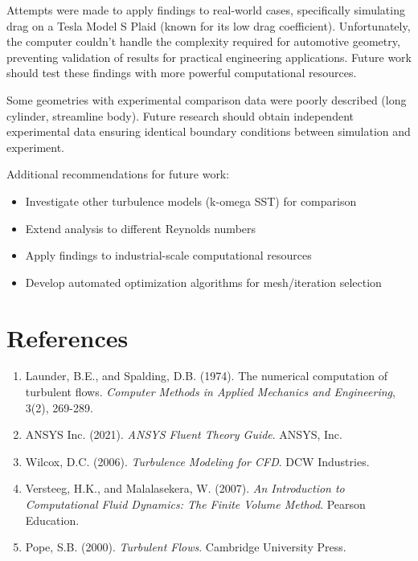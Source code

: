 \documentclass[12pt,a4paper]{article}
\begin{document}
Attempts were made to apply findings to real-world cases, specifically simulating drag on a Tesla Model S Plaid (known for its low drag coefficient). Unfortunately, the computer couldn't handle the complexity required for automotive geometry, preventing validation of results for practical engineering applications. Future work should test these findings with more powerful computational resources.

Some geometries with experimental comparison data were poorly described (long cylinder, streamline body). Future research should obtain independent experimental data ensuring identical boundary conditions between simulation and experiment.

Additional recommendations for future work:
\begin{itemize}
    \item Investigate other turbulence models (k-omega SST) for comparison
    \item Extend analysis to different Reynolds numbers
    \item Apply findings to industrial-scale computational resources
    \item Develop automated optimization algorithms for mesh/iteration selection
\end{itemize}

\section{References}

\begin{enumerate}
    \item Launder, B.E., and Spalding, D.B. (1974). The numerical computation of turbulent flows. \textit{Computer Methods in Applied Mechanics and Engineering}, 3(2), 269-289.
    
    \item ANSYS Inc. (2021). \textit{ANSYS Fluent Theory Guide}. ANSYS, Inc.
    
    \item Wilcox, D.C. (2006). \textit{Turbulence Modeling for CFD}. DCW Industries.
    
    \item Versteeg, H.K., and Malalasekera, W. (2007). \textit{An Introduction to Computational Fluid Dynamics: The Finite Volume Method}. Pearson Education.
    
    \item Pope, S.B. (2000). \textit{Turbulent Flows}. Cambridge University Press.
\end{enumerate}
\end{document}

